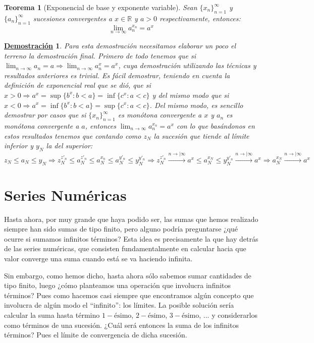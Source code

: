 \documentclass[10pt,a4paper,openright]{book}
\theoremstyle{break}
\newtheorem{theo}{Teorema}[chapter]
\newtheorem*{demo}{\underline{Demostración}}
\begin{document}
\begin{theo}[Exponencial de base y exponente variable]
Sean $\{x_n\}_{n=1}^\infty$ y $\{a_n\}_{n=1}^\infty$ sucesiones convergentes a $x\in \mathbb{R}$ y $a>0$ respectivamente, entonces:
\[
\lim_{n\rightarrow\infty}a_n^{x_n}=a^x
\]
\end{theo}
\begin{demo}
Para esta demostración necesitamos elaborar un poco el terreno la demostración final. Primero de todo tenemos que si $\lim_{n\rightarrow \infty} a_n=a\Rightarrow \lim_{n\rightarrow \infty}a_n^x=a^x$, cuya demostración utilizando las técnicas y resultados anteriores es trivial. Es fácil demostrar, teniendo en cuenta la definición de exponencial real que se dió, que si $x>0\Rightarrow a^x=\sup\{b^x: b<a\}=\inf\{c^x: a<c\}$ y del mismo modo que si $x<0\Rightarrow a^x=\inf\{b^x: b<a\}=\sup\{c^x: a<c\}$. Del mismo modo, es sencillo demostrar por casos que si $\{x_n\}_{n=1}^\infty$ es monótona convergente a $x$ y $a_n$ es monótona convergente a $a$, entonces $\lim_{n\rightarrow\infty} a_n^{x_n}=a^x$ con lo que basándonos en estos resultados tenemos que contando como $z_N$ la sucesión que tiende al límite inferior y $y_N$ la del superior:
$$z_N\leq a_N\leq y_N\Rightarrow z_N^{z'_n}\leq a_N^{z'_n}\leq a_N^{x_n}\leq a_N^{y'_n}\leq y_N^{y'_n}\Rightarrow z_N^{z'_n}\xrightarrow{n\rightarrow|\infty}a^x\leq a_N^{x_N}\leq y_N^{y'_n}\xrightarrow{n\rightarrow|\infty}a^x\Rightarrow a_N^{x_N}\xrightarrow{n\rightarrow|\infty}a^x$$
\end{demo}

\section{Series Numéricas}
Hasta ahora, por muy grande que haya podido ser, las sumas que hemos realizado siempre han sido sumas de tipo finito, pero alguno podría preguntarse ¿qué ocurre si sumamos infinitos términos? Esta idea es precisamente la que hay detrás de las series numéricas, que consisten fundamentalmente en calcular hacia que valor converge una suma cuando está se va haciendo infinita.

Sin embargo, como hemos dicho, hasta ahora sólo sabemos sumar cantidades de tipo finito, luego ¿cómo planteamos una operación que involucra infinitos términos? Pues como hacemos casi siempre que encontramos algún concepto que involucra de algún modo el ``infinito'': los límites. La posible solución sería calcular la suma hasta término $1-\mbox{ésimo}$, $2-\mbox{ésimo}$, $3-\mbox{ésimo}$, ... y considerarlos como términos de una sucesión. ¿Cuál será entonces la suma de los infinitos términos? Pues el límite de convergencia de dicha sucesión.
\end{document}
